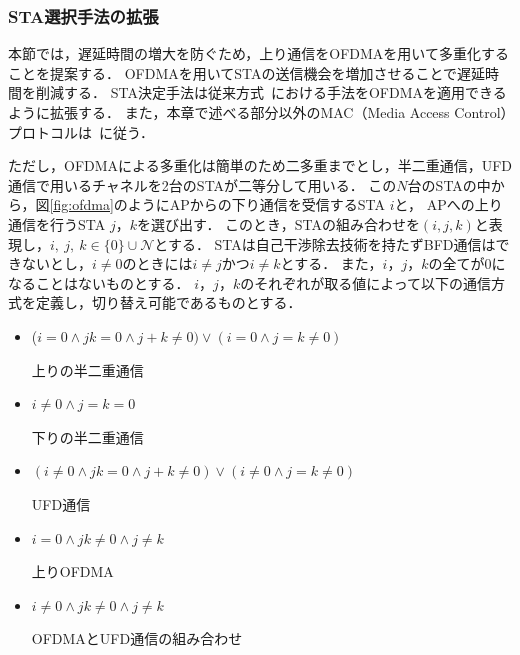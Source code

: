 \documentclass[master]{kuisthesis}		%
\newcommand{\mN}{{\mathcal N}}
\newcommand{\sijk}{(i,j,k)}
\begin{document}
			\subsubsection{STA選択手法の拡張}
				本節では，遅延時間の増大を防ぐため，上り通信をOFDMAを用いて多重化することを提案する．
				OFDMAを用いてSTAの送信機会を増加させることで遅延時間を削減する．
				STA決定手法は従来方式~\cite{promac_fair}における手法をOFDMAを適用できるように拡張する．
				また，本章で述べる部分以外のMAC（Media Access Control）プロトコルは~\cite{promac}に従う．
				\par
				ただし，OFDMAによる多重化は簡単のため二多重までとし，半二重通信，UFD通信で用いるチャネルを2台のSTAが二等分して用いる．
				この$N$台のSTAの中から，図\ref{fig:ofdma}のようにAPからの下り通信を受信するSTA $i$と，
				APへの上り通信を行うSTA $j$，$k$を選び出す．
				このとき，STAの組み合わせを$\sijk$と表現し，$i,\ j,\ k \in \{0\}\cup \mN$とする．
				STAは自己干渉除去技術を持たずBFD通信はできないとし，$i\neq0$のときには$i\neq j$かつ$i\neq k$とする．
				また，$i$，$j$，$k$の全てが0になることはないものとする．
				$i$，$j$，$k$のそれぞれが取る値によって以下の通信方式を定義し，切り替え可能であるものとする．
				\begin{itemize}%
					\item ($i=0\land jk=0\land j+k\neq0)\lor (i=0\land j=k\neq0)$\par
					\hspace*{15pt}上りの半二重通信
					\item $i\neq0\land j=k=0$\par
					\hspace*{15pt}下りの半二重通信
					\item $(i\neq0\land jk=0 \land j+k\neq0)\lor(i\neq0\land j=k\neq0)$\par
					\hspace*{15pt}UFD通信
					\item $i=0\land jk\neq0 \land j\neq k$\par
					\hspace*{15pt}上りOFDMA
					\item $i\neq0 \land jk\neq0 \land j\neq k$\par
					\hspace*{15pt}OFDMAとUFD通信の組み合わせ
				\end{itemize}
				\par
\end{document}
